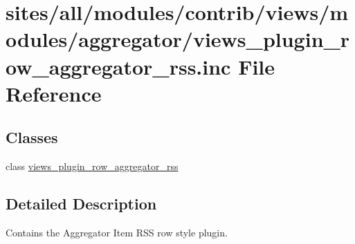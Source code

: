 \hypertarget{views__plugin__row__aggregator__rss_8inc}{
\section{sites/all/modules/contrib/views/modules/aggregator/views\_\-plugin\_\-row\_\-aggregator\_\-rss.inc File Reference}
\label{views__plugin__row__aggregator__rss_8inc}
}
\subsection*{Classes}
\begin{CompactItemize}
\item 
class \hyperlink{classviews__plugin__row__aggregator__rss}{views\_\-plugin\_\-row\_\-aggregator\_\-rss}
\end{CompactItemize}


\subsection{Detailed Description}
Contains the Aggregator Item RSS row style plugin. 